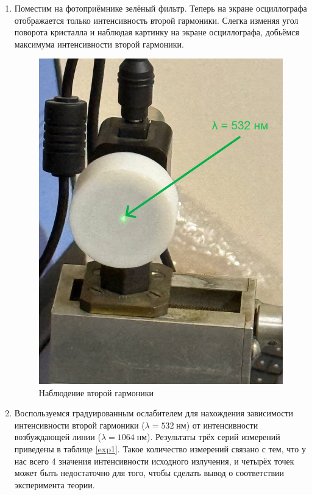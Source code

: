 \documentclass[a4paper,12pt]{article} %
\begin{document}
\begin{enumerate}
\item Поместим на фотоприёмнике зелёный фильтр. Теперь на экране осциллографа отображается только интенсивность второй гармоники. Слегка изменяя угол поворота кристалла и наблюдая картинку на экране осциллографа, добьёмся максимума интенсивности второй гармоники.
\begin{figure}[H]
\centering
\includegraphics[scale=0.2]{generate2w.jpg}
\caption{Наблюдение второй гармоники}
\end{figure}

\item Воспользуемся градуированным ослабителем для нахождения зависимости интенсивности второй гармоники ($\lambda = 532 \; нм$) от интенсивности возбуждающей линии ($\lambda = 1064 \; нм$). Результаты трёх серий измерений приведены в таблице \ref{exp1}. Такое количество измерений связано с тем, что у нас всего 4 значения интенсивности исходного излучения, и четырёх точек может быть недостаточно для того, чтобы сделать вывод о соответствии эксперимента теории.



\end{enumerate}
\end{document}

